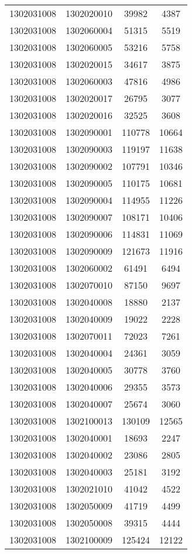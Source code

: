 \begin{longtable}[h]{llcc}
		1302031008 & 1302020010 & 39982 & 4387\\
		1302031008 & 1302060004 & 51315 & 5519\\
		1302031008 & 1302060005 & 53216 & 5758\\
		1302031008 & 1302020015 & 34617 & 3875\\
		1302031008 & 1302060003 & 47816 & 4986\\
		1302031008 & 1302020017 & 26795 & 3077\\
		1302031008 & 1302020016 & 32525 & 3608\\
		1302031008 & 1302090001 & 110778 & 10664\\
		1302031008 & 1302090003 & 119197 & 11638\\
		1302031008 & 1302090002 & 107791 & 10346\\
		1302031008 & 1302090005 & 110175 & 10681\\
		1302031008 & 1302090004 & 114955 & 11226\\
		1302031008 & 1302090007 & 108171 & 10406\\
		1302031008 & 1302090006 & 114831 & 11069\\
		1302031008 & 1302090009 & 121673 & 11916\\
		1302031008 & 1302060002 & 61491 & 6494\\
		1302031008 & 1302070010 & 87150 & 9697\\
		1302031008 & 1302040008 & 18880 & 2137\\
		1302031008 & 1302040009 & 19022 & 2228\\
		1302031008 & 1302070011 & 72023 & 7261\\
		1302031008 & 1302040004 & 24361 & 3059\\
		1302031008 & 1302040005 & 30778 & 3760\\
		1302031008 & 1302040006 & 29355 & 3573\\
		1302031008 & 1302040007 & 25674 & 3060\\
		1302031008 & 1302100013 & 130109 & 12565\\
		1302031008 & 1302040001 & 18693 & 2247\\
		1302031008 & 1302040002 & 23086 & 2805\\
		1302031008 & 1302040003 & 25181 & 3192\\
		1302031008 & 1302021010 & 41042 & 4522\\
		1302031008 & 1302050009 & 41719 & 4499\\
		1302031008 & 1302050008 & 39315 & 4444\\
		1302031008 & 1302100009 & 125424 & 12122\\

\end{longtable}
